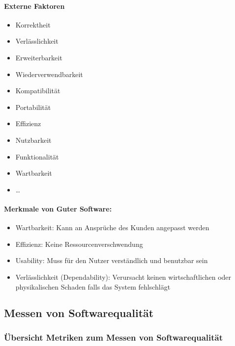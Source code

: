 \documentclass[
    ngerman,
    color=3b,
    summary,
    boxarc,
    main,
]{rubos-tuda-template}
\begin{document}
\paragraph{Externe Faktoren}
\begin{itemize}
    \item Korrektheit
    \item Verlässlichkeit
    \item Erweiterbarkeit
    \item Wiederverwendbarkeit
    \item Kompatibilität
    \item Portabilität
    \item Effizienz
    \item Nutzbarkeit
    \item Funktionalität
    \item Wartbarkeit
    \item \dots
\end{itemize}
\begin{defBox}
    \paragraph{Merkmale von Guter Software:}\begin{itemize}
        \item Wartbarkeit: Kann an Ansprüche des Kunden angepasst werden
        \item Effizienz: Keine Ressourcenverschwendung
        \item Usability: Muss für den Nutzer verständlich und benutzbar sein
        \item Verlässlichkeit (Dependability): Verursacht keinen wirtschaftlichen oder physikalischen Schaden falls das System fehlschlägt
    \end{itemize}
\end{defBox}

\clearpage
\subsection{Messen von Softwarequalität}
\subsubsection{Übersicht Metriken zum Messen von Softwarequalität}
\label{sec:metrics}
\end{document}
